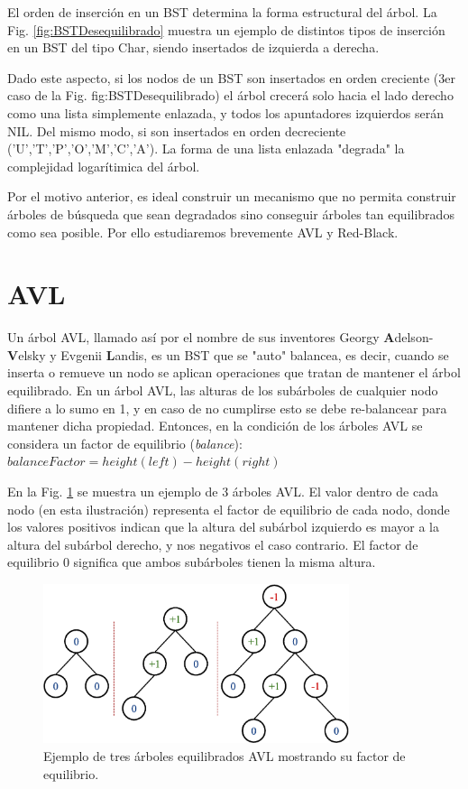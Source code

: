 El orden de inserción en un BST determina la forma estructural del árbol. La Fig. \ref{fig:BSTDesequilibrado} muestra un ejemplo de distintos tipos de inserción en un BST del tipo Char, siendo insertados de izquierda a derecha.

Dado este aspecto, si los nodos de un BST son insertados en orden creciente (3er caso de la Fig. {fig:BSTDesequilibrado}) el árbol crecerá solo hacia el lado derecho como una lista simplemente enlazada, y todos los apuntadores izquierdos serán NIL. Del mismo modo, si son insertados en orden decreciente ('U','T','P','O','M','C','A'). La forma de una lista enlazada "degrada" la complejidad logarítimica del árbol.

Por el motivo anterior, es ideal construir un mecanismo que no permita construir árboles de búsqueda que sean degradados sino conseguir árboles tan equilibrados como sea posible. Por ello estudiaremos brevemente AVL y Red-Black.

\section{AVL}

Un árbol AVL, llamado así por el nombre de sus inventores Georgy \textbf{A}delson-\textbf{V}elsky y Evgenii \textbf{L}andis, es un BST que se "auto" balancea, es decir, cuando se inserta o remueve un nodo se aplican operaciones que tratan de mantener el árbol equilibrado. En un árbol AVL, las alturas de los subárboles de cualquier nodo difiere a lo sumo en 1, y en caso de no cumplirse esto se debe re-balancear para mantener dicha propiedad. Entonces, en la condición de los árboles AVL se considera un factor de equilibrio (\textit{balance}):
$balanceFactor = height(left) - height(right)$

En la Fig. \ref{fig:AVLExample1} se muestra un ejemplo de 3 árboles AVL. El valor dentro de cada nodo (en esta ilustración) representa el factor de equilibrio de cada nodo, donde los valores positivos indican que la altura del subárbol izquierdo es mayor a la altura del subárbol derecho, y nos negativos el caso contrario. El factor de equilibrio 0 significa que ambos subárboles tienen la misma altura. 

\begin{figure}[htpb!]
  \begin{center}
    \includegraphics[width=0.8\textwidth]{images/AVLExample1.eps}
  \end{center}
  \caption{Ejemplo de tres árboles equilibrados AVL mostrando su factor de equilibrio.}
  \label{fig:AVLExample1}
\end{figure}

